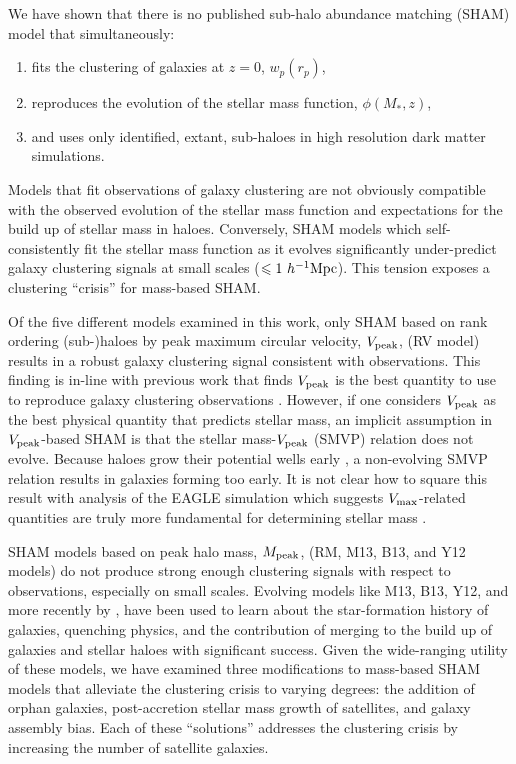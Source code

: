 \documentclass[useAMS,fleqn,usenatbib]{mnras}
\begin{document}
We have shown that there is no published sub-halo abundance matching (SHAM) model that simultaneously:
\begin{enumerate}
\item fits the clustering of galaxies at $z=0$, $w_p(r_p)$,
\item reproduces the evolution of the stellar mass function, $\phi(M_*,z)$,
\item and uses only identified, extant, sub-haloes in high resolution dark matter simulations.
\end{enumerate}
Models that fit observations of galaxy clustering are not obviously compatible with the observed evolution of the stellar mass function and expectations for the build up of stellar mass in haloes. Conversely, SHAM models which self-consistently fit the stellar mass function as it evolves significantly under-predict galaxy clustering signals at small scales ($\leq 1~h^{-1}{\rm Mpc}$). This tension exposes a clustering ``crisis'' for mass-based SHAM.   

Of the five different models examined in this work, only SHAM based on rank ordering (sub-)haloes by peak maximum circular velocity, $V_{\rm peak}$, (RV  model) results in a robust galaxy clustering signal consistent with observations.  This finding is in-line with previous work that finds $V_{\rm peak}$ is the best quantity to use to reproduce galaxy clustering observations \citep{Reddick:2013gi, Lehmann:2017fy}.  However, if one considers $V_{\rm peak}$ as the best physical quantity that predicts stellar mass, an implicit assumption in $V_{\rm peak}$-based SHAM is that the stellar mass-$V_{\rm peak}$ (SMVP) relation does not evolve.  Because haloes grow their potential wells early \citep[e.g.][]{Bosch:2014cu}, a non-evolving SMVP relation results in galaxies forming too early.  It is not clear how to square this result with analysis of the EAGLE simulation \citep{Schaye:2015gk} which suggests $V_{\rm max}$-related quantities are truly more fundamental for determining stellar mass \citep{ChavesMontero:2015dc, Matthee:2016vm}.

SHAM models based on peak halo mass, $M_{\rm peak}$, (RM, M13, B13, and Y12 models) do not produce strong enough clustering signals with respect to observations, especially on small scales.  Evolving models like M13, B13, Y12, and more recently by \citet{RodriguezPuebla:2017uo}, have been used to learn about the star-formation history of galaxies, quenching physics, and the contribution of merging to the build up of galaxies and stellar haloes with significant success.  Given the wide-ranging utility of these models, we have examined three modifications to mass-based SHAM models that alleviate the clustering crisis to varying degrees: the addition of orphan galaxies, post-accretion stellar mass growth of satellites, and galaxy assembly bias.  Each of these ``solutions'' addresses the clustering crisis by increasing the number of satellite galaxies.
\end{document}
